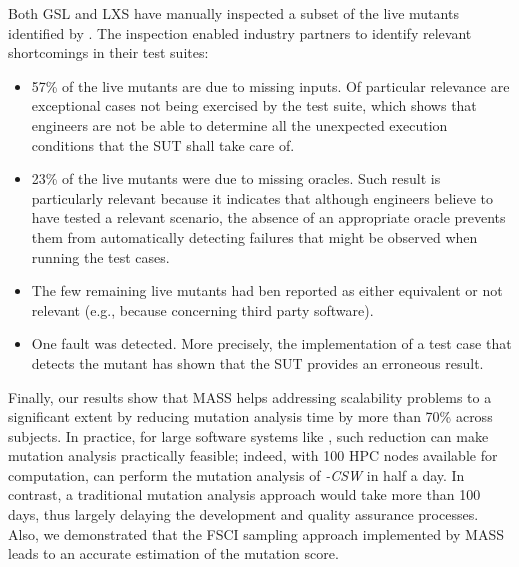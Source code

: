 Both GSL and LXS have manually inspected a subset of the live mutants identified by \MASS. The inspection enabled industry partners to identify relevant shortcomings in their test suites: 
\begin{itemize}
\item 57\% of the live mutants are due to missing inputs. Of particular relevance are exceptional cases not being exercised by the test suite, which shows that engineers are not be able to determine all the unexpected execution conditions that the SUT shall take care of.
\item 23\% of the live mutants were due to missing oracles. Such result is particularly relevant because it indicates that although engineers believe to have tested a relevant scenario, the absence of an appropriate oracle prevents them from automatically detecting failures that might be observed when running the test cases.
\item The few remaining live mutants had ben reported as either equivalent or not relevant (e.g., because concerning third party software).
\item One fault was detected. More precisely, the implementation of a test case that detects the mutant has shown that the SUT provides an erroneous result.
\end{itemize}



Finally, our results show that MASS helps addressing scalability problems to a significant extent by reducing mutation analysis time by more than 70\% across subjects. 
In practice, for large software systems like \SAIL{}, such reduction can make mutation analysis practically feasible; indeed, with 100 HPC nodes available for computation, \MASS can perform the mutation analysis of \SAIL{}\emph{-CSW} in half a day. In contrast, a traditional mutation analysis approach would take more than 100 days, thus largely delaying the development and quality assurance processes.
Also, we demonstrated that the FSCI sampling approach implemented by MASS leads to an accurate estimation of the mutation score. 




